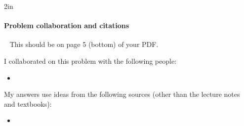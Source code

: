 \begin{blue}

  \REPLACEME

\end{blue}


\vfill

\begin{answerBox}{2in}          %
  
  \paragraph{Problem  collaboration and citations}~\GradescopeComment
  {This should be on page 5 (bottom) of your PDF.}

  I collaborated on this problem with the following people:
  \begin{blue}
    \begin{itemize}
    \item \REPLACEME                    %
    \end{itemize}
  \end{blue}

  My answers use ideas from the following sources (other than the lecture notes and textbooks): 
  \begin{blue}
    \begin{itemize}
    \item \REPLACEME                    %
    \end{itemize}
  \end{blue}

\end{answerBox}

